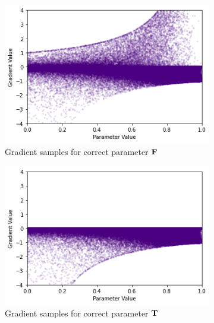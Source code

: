 \begin{figure}[h]
    \centering
    \begin{subfigure}[b]{0.47\textwidth}
        \centering
        \includegraphics[width=\textwidth]{imgs/grad_ss_bce_falseparam_10dim.png}
        \caption{Gradient samples for correct parameter $\textbf{F}$}
        \label{fig:conjgrad10falsessbce}
    \end{subfigure}
    \begin{subfigure}[b]{0.47\textwidth}
        \centering
        \includegraphics[width=\textwidth]{imgs/grad_ss_bce_trueparam_10dim.png}
        \caption{Gradient samples for correct parameter $\textbf{T}$}
        \label{fig:conjgrad10truessbce}
    \end{subfigure}
    \begin{subfigure}[b]{0.47\textwidth}
        \centering

\end{subfigure}
\end{figure}
